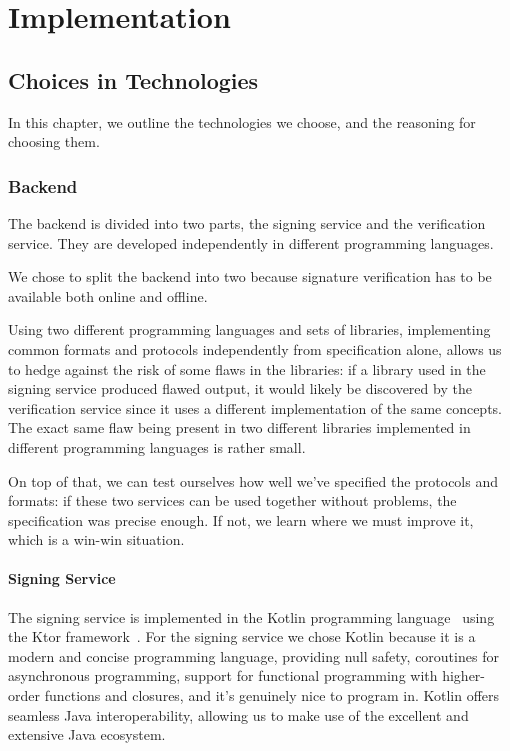 \chapter{Implementation}
\section{Choices in Technologies}
\label{sec:techchoices}
In this chapter, we outline the technologies we choose, and the reasoning for choosing them.

\subsection{Backend}
\label{subsec:techbackend}
The backend is divided into two parts, the signing service and the verification service.
They are developed independently in different programming languages.

We chose to split the backend into two because signature verification has to be available both online and offline.

Using two different programming languages and sets of libraries,
implementing common formats and protocols independently from specification alone,
allows us to hedge against the risk of some flaws in the libraries: if a library used in the signing service produced flawed output,
it would likely be discovered by the verification service since it uses a different implementation of the same concepts.
The exact same flaw being present in two different libraries implemented in different programming languages is rather small.

On top of that, we can test ourselves how well we've specified the protocols and formats:
if these two services can be used together without problems, the specification was precise enough.
If not, we learn where we must improve it, which is a win-win situation.

\subsubsection{Signing Service}
The signing service is implemented in the Kotlin programming language~\cite{kotlin} using the Ktor framework~\cite{ktor}.
For the signing service we chose Kotlin because it is a modern and concise programming language,
providing null safety, coroutines for asynchronous programming,
support for functional programming with higher-order functions and closures,
and it's genuinely nice to program in.
Kotlin offers seamless Java interoperability, allowing us to make use of the excellent and extensive Java ecosystem.

